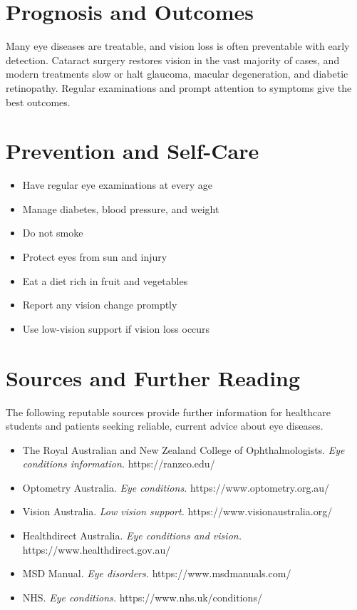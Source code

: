 \section*{Prognosis and Outcomes}
Many eye diseases are treatable, and vision loss is often preventable with early detection. Cataract surgery restores vision in the vast majority of cases, and modern treatments slow or halt glaucoma, macular degeneration, and diabetic retinopathy. Regular examinations and prompt attention to symptoms give the best outcomes.

\section*{Prevention and Self-Care}
\begin{itemize}
    \item Have regular eye examinations at every age
    \item Manage diabetes, blood pressure, and weight
    \item Do not smoke
    \item Protect eyes from sun and injury
    \item Eat a diet rich in fruit and vegetables
    \item Report any vision change promptly
    \item Use low-vision support if vision loss occurs
\end{itemize}

\section*{Sources and Further Reading}
The following reputable sources provide further information for healthcare students and patients seeking reliable, current advice about eye diseases.
\begin{itemize}
    \item The Royal Australian and New Zealand College of Ophthalmologists. \textit{Eye conditions information.} https://ranzco.edu/
    \item Optometry Australia. \textit{Eye conditions.} https://www.optometry.org.au/
    \item Vision Australia. \textit{Low vision support.} https://www.visionaustralia.org/
    \item Healthdirect Australia. \textit{Eye conditions and vision.} https://www.healthdirect.gov.au/
    \item MSD Manual. \textit{Eye disorders.} https://www.msdmanuals.com/
    \item NHS. \textit{Eye conditions.} https://www.nhs.uk/conditions/
\end{itemize}
